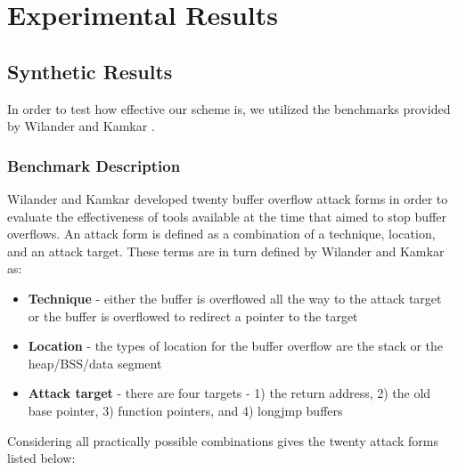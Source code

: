 
\renewcommand{\thechapter}{4}

\chapter{Experimental Results}

\section{Synthetic Results}

In order to test how effective our scheme is, we utilized the benchmarks provided by Wilander and
Kamkar \cite{}.

\subsection{Benchmark Description}

Wilander and Kamkar developed twenty buffer overflow attack forms in order to evaluate the
effectiveness of tools available at the time that aimed to stop buffer overflows. An attack form is
defined as a combination of a technique, location, and an attack target. These terms are in turn
defined by Wilander and Kamkar as:

\begin{itemize}

\item \textbf{Technique} - either the buffer is overflowed all the way to the attack target
or the buffer is overflowed to redirect a pointer to the target

\item \textbf{Location} - the types of location for the buffer overflow are the stack or the
heap/BSS/data segment

\item \textbf{Attack target} - there are four targets - 1) the return address, 2) the old
base pointer, 3) function pointers, and 4) longjmp buffers

\end{itemize}

Considering all practically possible combinations gives the twenty attack forms listed below:

